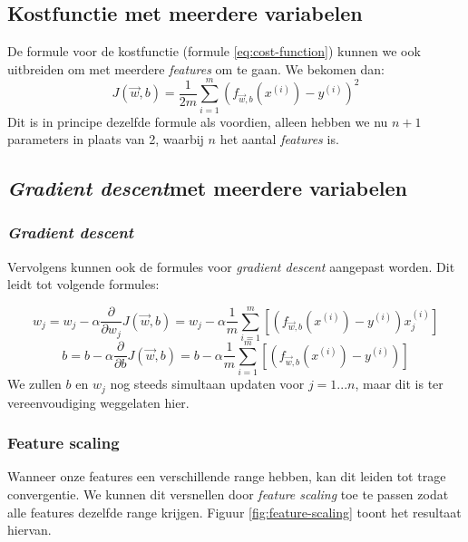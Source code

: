 \subsection{Kostfunctie met meerdere variabelen}

De formule voor de kostfunctie (formule \ref{eq:cost-function}) kunnen we ook uitbreiden om met meerdere \textit{features} om te gaan. We bekomen dan:
\begin{equation}
	J(\vec{w}, b) = \frac{1}{2m}\sum_{i=1}^{m}(f_{\vec{w},b}(x^{(i)}) - y^{(i)})^{2}
	\label{eq:cost-function-multi}
\end{equation}
\noindent
Dit is in principe dezelfde formule als voordien, alleen hebben we nu $n+1$ parameters in plaats van 2, waarbij $n$ het aantal \textit{features} is.
\newpage

\subsection{\textit{Gradient descent}met meerdere variabelen}

\subsubsection{\textit{Gradient descent}}

Vervolgens kunnen ook de formules voor \textit{gradient descent} aangepast worden. Dit leidt tot volgende formules:

\begin{equation}
	w_{j} = w_{j} - \alpha \frac{\partial}{\partial w_{j}} J(\vec{w}, b) = w_{j} - \alpha \frac{1}{m}\sum_{i=1}^{m}[(f_{\vec{w},b}(x^{(i)}) - y^{(i)})x^{(i)}_{j}]
\end{equation}
\begin{equation}
	b = b - \alpha \frac{\partial}{\partial b} J(\vec{w}, b) = b - \alpha \frac{1}{m}\sum_{i=1}^{m}[(f_{\vec{w},b}(x^{(i)}) - y^{(i)})]
\end{equation}
\noindent
We zullen $b$ en $w_{j}$ nog steeds simultaan updaten voor $j = 1...n$, maar dit is ter vereenvoudiging weggelaten hier.

\subsubsection{Feature scaling}

Wanneer onze features een verschillende range hebben, kan dit leiden tot trage convergentie. We kunnen dit versnellen door \textit{feature scaling} toe te passen zodat alle features dezelfde range krijgen. Figuur \ref{fig:feature-scaling} toont het resultaat hiervan.

